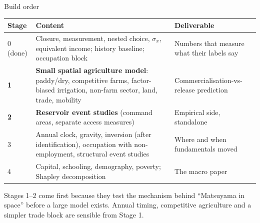 \documentclass[10pt,aspectratio=169]{beamer}
\begin{document}
\begin{frame}{Build order}
  \footnotesize
  \begin{tabular}{@{}lL{0.58\textwidth}L{0.3\textwidth}@{}}
    \toprule
    Stage & Content & Deliverable \\
     (done) & Closure, measurement, nested choice, $\sigma_x$, equivalent income;
      history baseline; occupation block &
      Numbers that measure what their labels say \\
    \textbf{1} & \textbf{Small spatial agriculture model}: paddy/dry, competitive farms,
      factor-biased irrigation, non-farm sector, land, trade, mobility &
      Commercialisation-vs-release prediction \\
    \textbf{2} & \textbf{Reservoir event studies} (command areas, separate access measures) &
      Empirical side, standalone \\
    3 & Annual clock, gravity, inversion (after identification), occupation with
      non-employment, structural event studies & Where and when fundamentals moved \\
    4 & Capital, schooling, demography, poverty; Shapley decomposition & The macro paper \\
    \bottomrule
  \end{tabular}
  \par\vspace{1em}
  \small Stages 1--2 come first because they test the mechanism behind ``Matsuyama in
  space'' before a large model exists. Annual timing, competitive agriculture and a simpler
  trade block are sensible from Stage 1.
\end{frame}
\end{document}
